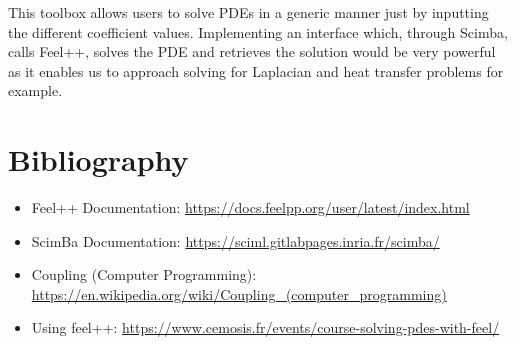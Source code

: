 \documentclass{article}
\begin{document}
\begin{frame}{}

This toolbox allows users to solve PDEs in a generic manner just by inputting the different coefficient values. Implementing an interface which, through Scimba, calls Feel++, solves the PDE and retrieves the solution would be very powerful as it enables us to approach solving for Laplacian and heat transfer problems for example.
\end{frame}




\section{Bibliography}

\begin{itemize}
    \item Feel++ Documentation: \url{https://docs.feelpp.org/user/latest/index.html}
    \item ScimBa Documentation: \url{https://sciml.gitlabpages.inria.fr/scimba/}
    \item Coupling (Computer Programming): \url{https://en.wikipedia.org/wiki/Coupling_(computer_programming)}
    \item Using feel++:
    \url{https://www.cemosis.fr/events/course-solving-pdes-with-feel/}
\end{itemize}
\end{document}
